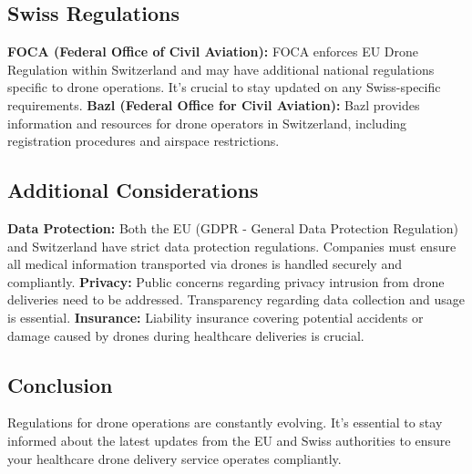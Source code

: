 \subsection{Swiss Regulations}
\textbf{FOCA (Federal Office of Civil Aviation):} FOCA enforces EU Drone Regulation within Switzerland and may have additional national regulations specific to drone operations. It's crucial to stay updated on any Swiss-specific requirements.
\newline
\textbf{Bazl (Federal Office for Civil Aviation):} Bazl provides information and resources for drone operators in Switzerland, including registration procedures and airspace restrictions.
\subsection{Additional Considerations}
\textbf{Data Protection:} Both the EU (GDPR - General Data Protection Regulation) and Switzerland have strict data protection regulations. Companies must ensure all medical information transported via drones is handled securely and compliantly.
\newline
\textbf{Privacy:} Public concerns regarding privacy intrusion from drone deliveries need to be addressed. Transparency regarding data collection and usage is essential.
\newline
\textbf{Insurance:} Liability insurance covering potential accidents or damage caused by drones during healthcare deliveries is crucial.
\subsection{Conclusion}
Regulations for drone operations are constantly evolving.  It's essential to stay informed about the latest updates from the EU and Swiss authorities to ensure your healthcare drone delivery service operates compliantly.

